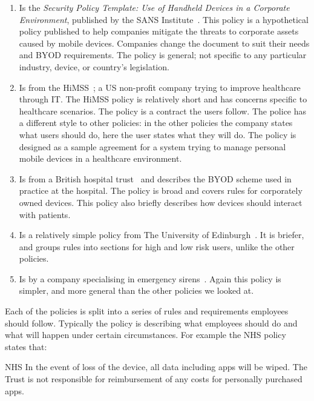 \documentclass[thesis.tex]{subfiles}
\begin{document}
\begin{enumerate}
\item Is the \emph{Security Policy Template: Use of Handheld Devices
    in a Corporate Environment}, published by the SANS
  Institute~\cite{nicholas_r._c._guerin_security_2008}. This policy is a
  hypothetical policy published to help companies mitigate the threats
  to corporate assets caused by mobile devices. Companies change the
  document to suit their needs and BYOD requirements. The policy is
  general; not specific to any particular industry, device, or country's
  legislation.
\item Is from the
  \ac{HiMSS}~\cite{healthcare_information_and_management_systems_society_mobile_2012};
  a US non-profit company trying to improve healthcare through IT. The
  \ac{HiMSS} policy is relatively short and has concerns specific to
  healthcare scenarios. The policy is a contract the users follow. The
  police has a different style to other policies: in the other policies
  the company states what users should do, here the user states what
  they will do.  The policy is designed as a sample agreement for a
  system trying to manage personal mobile devices in a healthcare
  environment.
\item Is from a British hospital trust~\cite{kennington_mobiles_2014}
  and describes the BYOD scheme used in practice at the hospital.  The
  policy is broad and covers rules for corporately owned devices.  This
  policy also briefly describes how devices should interact with
  patients.
\item Is a relatively simple policy from The University of
  Edinburgh~\cite{williamson_bring_2015}. It is briefer, and groups
  rules into sections for high and low risk users, unlike the other
  policies.
\item Is by a company specialising in emergency
  sirens~\cite{code3pse.org_sample_????}. Again this policy is simpler,
  and more general than the other policies we looked at.
\end{enumerate}

Each of the policies is split into a series of rules and requirements employees
should follow. Typically the policy is describing what employees should
do and what will happen under certain circumstances. For example the NHS policy
states that:

\begin{policyrule}{NHS}
  In the event of loss of the device, all data including apps will be wiped. The Trust
  is not responsible for reimbursement of any costs for personally purchased apps.
\end{policyrule}
\end{document}
